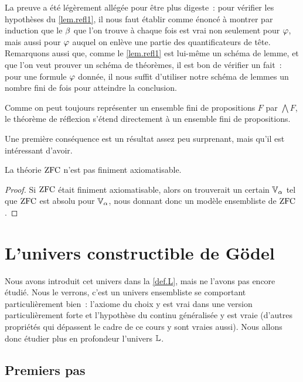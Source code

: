 \begin{remark}
  La preuve a été légèrement allégée pour être plus digeste~: pour vérifier les
  hypothèses du \cref{lem.refl1}, il nous faut établir comme énoncé à montrer
  par induction que le $\beta$ que l'on trouve à chaque fois est vrai non
  seulement pour $\varphi$, mais aussi pour $\varphi$ auquel on enlève une
  partie des quantificateurs de tête. Remarquons aussi que, comme le
  \cref{lem.refl1} est lui-même un schéma de lemme, et que l'on veut prouver
  un schéma de théorèmes, il est bon de vérifier un fait~: pour une formule
  $\varphi$ donnée, il nous suffit d'utiliser notre schéma de lemmes un nombre
  fini de fois pour atteindre la conclusion.
\end{remark}

\begin{remark}
  Comme on peut toujours représenter un ensemble fini de propositions $F$ par
  $\bigwedge F$, le théorème de réflexion s'étend directement à un ensemble fini
  de propositions.
\end{remark}

Une première conséquence est un résultat assez peu surprenant, mais qu'il est
intéressant d'avoir.

\begin{proposition}
  La théorie $\operatorname{ZFC}$ n'est pas finiment axiomatisable.
\end{proposition}

\begin{proof}
  Si $\operatorname{ZFC}$ était finiment axiomatisable, alors on trouverait un certain
  $\mathbb V_\alpha$ tel que $\operatorname{ZFC}$ est absolu pour $\mathbb V_\alpha$, nous
  donnant donc un modèle ensembliste de $\operatorname{ZFC}$.
\end{proof}

\section{L'univers constructible de Gödel}

Nous avons introduit cet univers dans la \cref{def.L}, mais ne l'avons pas
encore étudié. Nous le verrons, c'est un univers ensembliste se comportant
particulièrement bien~: l'axiome du choix y est vrai dans une version
particulièrement forte et l'hypothèse du continu généralisée y est vraie
(d'autres propriétés qui dépassent le cadre de ce cours y sont vraies aussi).
Nous allons donc étudier plus en profondeur l'univers $\mathbb L$.

\subsection{Premiers pas}

